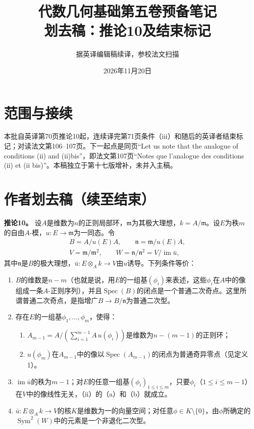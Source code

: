 \documentclass[openany,fontset=fandol]{ctexbook}
\newcommand{\im}{\operatorname{im}}
\newcommand{\Sym}{\operatorname{Sym}}
\newcommand{\Spec}{\operatorname{Spec}}
\newcommand{\m}{\mathfrak m}
\newcommand{\n}{\mathfrak n}
\begin{document}
\title{代数几何基础第五卷预备笔记\\划去稿：推论10及结束标记}
\author{据英译编辑稿续译，参校法文扫描}
\date{2026年11月20日}
\maketitle
\chapter*{范围与接续}
本批自英译第70页推论10起，连续译完第71页条件（iii）和随后的英译者结束标记；对读法文第106--107页。下一起点是同页“Let us note that the analogue of conditions (ii) and (ii)bis”，即法文第107页“Notes que l’analogue des conditions (ii) et (ii bis)”。本稿独立于第十七版增补，未并入主稿。
\chapter*{作者划去稿（续至结束）}
\noindent\textbf{推论10。}
设$A$是维数为$n$的正则局部环，$\m$为其极大理想，$k=A/\m$。设$E$为秩$m$的自由$A$-模，$u:E\to\m$为一同态。令
\[
\begin{gathered}B=A/u(E)A,\qquad \n=\m/u(E)A,\\ V=\m/\m^2,
\qquad W=\n/\n^2=V/\im\bar u,\end{gathered}
\]
其中$\n$是$B$的极大理想，$\bar u:E\otimes_A k\to V$由$u$诱导。下列条件等价：
\begin{enumerate}
\item[(i)] $B$的维数是$n-m$（也就是说，用$E$的一组基$(\phi_i)$来表述，这些$\phi_i$在$A$中的像组成一条$A$-正则序列），并且$\Spec(B)$的闭点是一个普通二次奇点。这里所谓普通二次奇点，是指增广$B\to B/\n$为普通二次型。
\item[(ii)] 存在$E$的一组基$\phi_1,\ldots,\phi_m$，使得：
\begin{enumerate}
\item[(a)] $A_{m-1}=A/(\sum_{i=1}^{m-1}A\,u(\phi_i))$是维数为$n-(m-1)$的正则环；
\item[(b)] $u(\phi_m)$在$A_{m-1}$中的像以$\Spec(A_{m-1})$的闭点为普通奇异零点（见定义1）。
\end{enumerate}
\item[(ii bis)] $\im\bar u$的秩为$m-1$；对$E$的任意一组基$(\phi_i)_{1\le i\le m}$，只要$\phi_i$（$1\le i\le m-1$）在$V$中的像线性无关，（ii）的（a）和（b）就成立。
\item[(iii)] $\bar u:E\otimes_A k\to V$的核$K$是维数为一的向量空间；对任意$\phi\in K\setminus\{0\}$，由$\phi$所确定的$\Sym^2(W)$中的元素是一个非退化二次型。
\end{enumerate}
\end{document}
